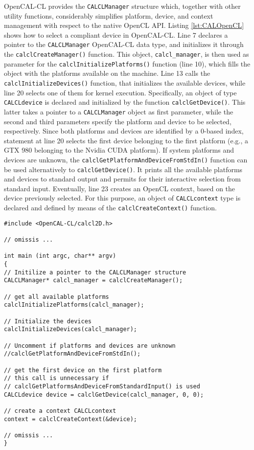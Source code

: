 OpenCAL-CL provides the \verb'CALCLManager' structure which,
together with other utility functions, considerably simplifies
platform, device, and context management with respect to the
native OpenCL API. Listing \ref{lst:CALOpenCL} shows how to select
a compliant device in OpenCAL-CL. Line 7 declares a pointer to the
\verb'CALCLManager' OpenCAL-CL data type, and initializes it
through the \verb'calclCreateManager()' function. This object,
\verb'calcl_manager', is then used as parameter for the
\verb'calclInitializePlatforms()' function (line 10), which fills
the object with the platforms available on the machine. Line 13
calls the \verb'calclInitializeDevices()' function, that
initializes the available devices, while line 20 selects one of
them for kernel execution. Specifically, an object of type
\verb'CALCLdevice' is declared and initialized by the function
\verb'calclGetDevice()'. This latter takes a pointer to a
\verb'CALCLManager' object as first parameter, while the second
and third parameters specify the platform and device to be
selected, respectively. Since both platforms and devices are
identified by a 0-based index, statement at line 20 selects the
first device belonging to the first platform (e.g., a GTX 980
belonging to the Nvidia CUDA platform). If system platforms and
devices are unknown, the
\verb'calclGetPlatformAndDeviceFromStdIn()' function can be used
alternatively to \verb'calclGetDevice()'. It prints all the
available platforms and devices to standard output and permits for
their interactive selection from standard input. Eventually, line
23 creates an OpenCL context, based on the device previously
selected. For this purpose, an object of \verb'CALCLcontext' type
is declared and defined by means of the
\verb'calclCreateContext()' function.


\begin{lstlisting}
#include <OpenCAL-CL/calcl2D.h>

// omissis ...

int main (int argc, char** argv)
{
// Initilize a pointer to the CALCLManager structure
CALCLManager* calcl_manager = calclCreateManager();

// get all available platforms
calclInitializePlatforms(calcl_manager);

// Initialize the devices
calclInitializeDevices(calcl_manager);

// Uncomment if platforms and devices are unknown
//calclGetPlatformAndDeviceFromStdIn();

// get the first device on the first platform
// this call is unnecessary if
// calclGetPlatformsAndDeviceFromStandardInput() is used
CALCLdevice device = calclGetDevice(calcl_manager, 0, 0);

// create a context CALCLcontext
context = calclCreateContext(&device);

// omissis ...
}
\end{lstlisting}

